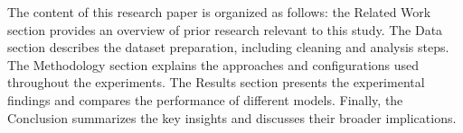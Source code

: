 The content of this research paper is organized as follows: the Related Work section provides an overview of prior research relevant to this study. The Data section describes the dataset preparation, including cleaning and analysis steps. The Methodology section explains the approaches and configurations used throughout the experiments. The Results section presents the experimental findings and compares the performance of different models. Finally, the Conclusion summarizes the key insights and discusses their broader implications.